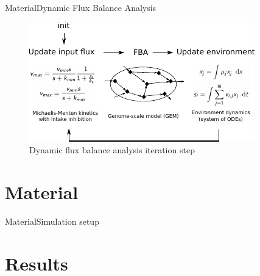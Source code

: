 \documentclass{beamer}
\begin{document}
\begin{frame}{Material}{Dynamic Flux Balance Analysis}

\begin{figure}[!h]
\includegraphics[width=\linewidth]{Img/dfba.pdf}
\caption{Dynamic flux balance analysis iteration step}
\label{fig:dfba}
\end{figure}

% 
  
\end{frame}

\section{Material}
\begin{frame}{Material}{Simulation setup}
  
\end{frame}

\section{Results}
\begin{frame}
  
\end{frame}
\end{document}
